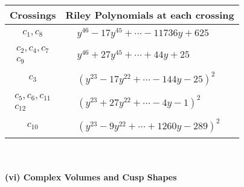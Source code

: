 \documentclass[1p]{elsarticle_modified}
\theoremstyle{definition}
\begin{document}
\begin{tabular}{m{50pt}|m{274pt}}
Crossings & \hspace{64pt}Riley Polynomials at each crossing \\
\hline $$\begin{aligned}c_{1},c_{8}\end{aligned}$$&$\begin{aligned}
&y^{46}-17 y^{45}+\cdots-11736 y+625
\end{aligned}$\\
\hline $$\begin{aligned}c_{2},c_{4},c_{7}\\c_{9}\end{aligned}$$&$\begin{aligned}
&y^{46}+27 y^{45}+\cdots+44 y+25
\end{aligned}$\\
\hline $$\begin{aligned}c_{3}\end{aligned}$$&$\begin{aligned}
&(y^{23}-17 y^{22}+\cdots-144 y-25)^{2}
\end{aligned}$\\
\hline $$\begin{aligned}c_{5},c_{6},c_{11}\\c_{12}\end{aligned}$$&$\begin{aligned}
&(y^{23}+27 y^{22}+\cdots-4 y-1)^{2}
\end{aligned}$\\
\hline $$\begin{aligned}c_{10}\end{aligned}$$&$\begin{aligned}
&(y^{23}-9 y^{22}+\cdots+1260 y-289)^{2}
\end{aligned}$\\
\hline
\end{tabular}\\~\\
\newpage\flushleft \textbf{(vi) Complex Volumes and Cusp Shapes}
\end{document}

